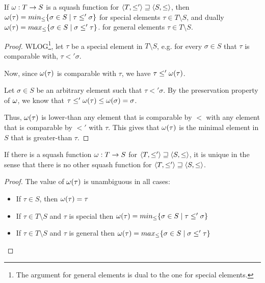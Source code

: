 \documentclass[main.tex]{subfiles}
\begin{document}
\begin{property}\label{prop:squashminmax}
    If $\omega: T \rightarrow S$ is a squash function for
    $\langle  T,  \leq'  \rangle \sqsupseteq \langle  S,  \leq  \rangle$,
    then $\omega(\tau) = min_{\leq} \{ \sigma \in S \mid \tau \leq' \sigma \}$
    for special elements $\tau \in T \setminus S$, and dually
    $\omega(\tau) = max_{\leq} \{ \sigma \in S \mid \sigma \leq' \tau \}$.
    for general elements $\tau \in T \setminus S$.
\end{property}
\begin{proof}
    WLOG\footnote{The argument for general elements is dual to the one for special
        elements.},
    let $\tau$ be a special element in $T \setminus S$, e.g. for every
    $\sigma \in S$ that $\tau$ is comparable with, $\tau \less' \sigma$.

    Now, since $\omega(\tau)$ is comparable with $\tau$, we have
    $\tau \leq' \omega(\tau)$.

    Let $\sigma \in S$ be an arbitrary element such that $\tau \less' \sigma$.
    By the preservation property of $\omega$, we know that
    $\tau \leq' \omega(\tau) \leq \omega(\sigma) = \sigma$.

    Thus, $\omega(\tau)$ is lower-than any element that is comparable
    by $\less$ with any element that is comparable by $\less'$ with $\tau$.
    This gives that $\omega(\tau)$ is the minimal element in $S$ that is
    greater-than $\tau$.
\end{proof}
\begin{corollary}\label{prop:squash:unique}
    If there is a squash function $\omega: T \rightarrow S$ for
    $\langle  T,  \leq'  \rangle \sqsupseteq \langle  S,  \leq  \rangle$,
    it is unique in the sense that there is no other squash function for
    $\langle  T,  \leq'  \rangle \sqsupseteq \langle  S,  \leq  \rangle$.
\end{corollary}
\begin{proof}
    The value of $\omega(\tau)$ is unambiguous in all cases:
    \begin{itemize}
        \item If $\tau \in S$, then $\omega(\tau) = \tau$
        \item If $\tau \in T \setminus S$ and $\tau$ is special
            then $\omega(\tau) = min_{\leq} \{ \sigma \in S \mid \tau \leq' \sigma \}$
        \item If $\tau \in T \setminus S$ and $\tau$ is general
            then $\omega(\tau) = max_{\leq} \{ \sigma \in S \mid \sigma \leq' \tau \}$
    \end{itemize}
\end{proof}
\end{document}
